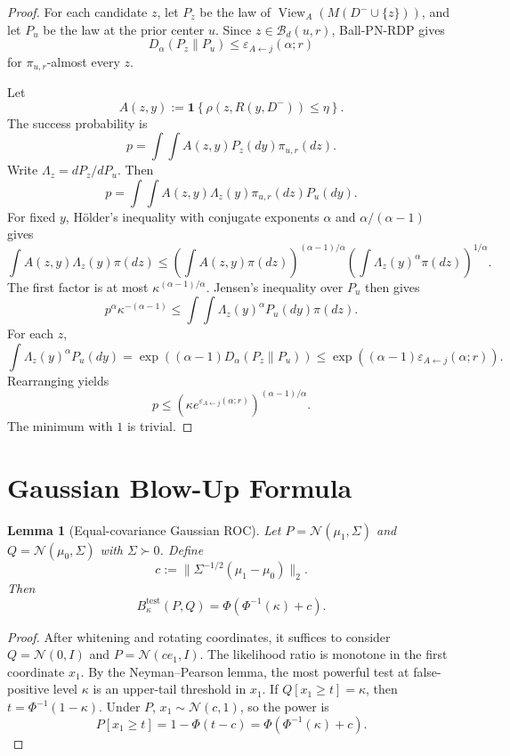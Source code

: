 \documentclass[conference,compsoc]{IEEEtran}
\newtheorem{lemma}{Lemma}
\newcommand{\N}{\mathcal{N}}
\newcommand{\cB}{\mathcal{B}}
\newcommand{\eps}{\varepsilon}
\newcommand{\ind}[1]{\mathbf{1}\!\left\{#1\right\}}
\begin{document}
\begin{proof}
For each candidate $z$, let $P_z$ be the law of $\operatorname{View}_A(M(D^-\cup\{z\}))$, and let $P_u$ be the law at the prior center $u$. Since $z\in\cB_d(u,r)$, Ball-PN-RDP gives
\[
D_\alpha(P_z\|P_u)\le\eps_{A\leftarrow j}(\alpha;r)
\]
for $\pi_{u,r}$-almost every $z$.

Let
\[
A(z,y):=\ind{\rho(z,R(y,D^-))\le\eta}.
\]
The success probability is
\[
p=\int\int A(z,y)P_z(dy)\pi_{u,r}(dz).
\]
Write $\Lambda_z=dP_z/dP_u$. Then
\[
p=\int\int A(z,y)\Lambda_z(y)\pi_{u,r}(dz)P_u(dy).
\]
For fixed $y$, H\"older's inequality with conjugate exponents $\alpha$ and $\alpha/(\alpha-1)$ gives
\[
\int A(z,y)\Lambda_z(y)\pi(dz)
\le
\left(\int A(z,y)\pi(dz)\right)^{(\alpha-1)/\alpha}
\left(\int \Lambda_z(y)^\alpha\pi(dz)\right)^{1/\alpha}.
\]
The first factor is at most $\kappa^{(\alpha-1)/\alpha}$. Jensen's inequality over $P_u$ then gives
\[
p^\alpha\kappa^{-(\alpha-1)}
\le
\int\int \Lambda_z(y)^\alpha P_u(dy)\pi(dz).
\]
For each $z$,
\[
\int \Lambda_z(y)^\alpha P_u(dy)
=\exp((\alpha-1)D_\alpha(P_z\|P_u))
\le\exp((\alpha-1)\eps_{A\leftarrow j}(\alpha;r)).
\]
Rearranging yields
\[
p\le(\kappa e^{\eps_{A\leftarrow j}(\alpha;r)})^{(\alpha-1)/\alpha}.
\]
The minimum with $1$ is trivial.
\end{proof}

\section{Gaussian Blow-Up Formula}
\label{app:gaussian-blowup}

\begin{lemma}[Equal-covariance Gaussian ROC]
\label{lem:gaussian-roc}
Let $P=\N(\mu_1,\Sigma)$ and $Q=\N(\mu_0,\Sigma)$ with $\Sigma\succ0$. Define
\[
c:=\|\Sigma^{-1/2}(\mu_1-\mu_0)\|_2.
\]
Then
\[
B_\kappa^{\mathrm{test}}(P,Q)=\Phi(\Phi^{-1}(\kappa)+c).
\]
\end{lemma}

\begin{proof}
After whitening and rotating coordinates, it suffices to consider $Q=\N(0,I)$ and $P=\N(ce_1,I)$. The likelihood ratio is monotone in the first coordinate $x_1$. By the Neyman--Pearson lemma, the most powerful test at false-positive level $\kappa$ is an upper-tail threshold in $x_1$. If $Q[x_1\ge t]=\kappa$, then $t=\Phi^{-1}(1-\kappa)$. Under $P$, $x_1\sim\N(c,1)$, so the power is
\[
P[x_1\ge t]
=1-\Phi(t-c)
=\Phi(\Phi^{-1}(\kappa)+c).
\]
\end{proof}
\end{document}
